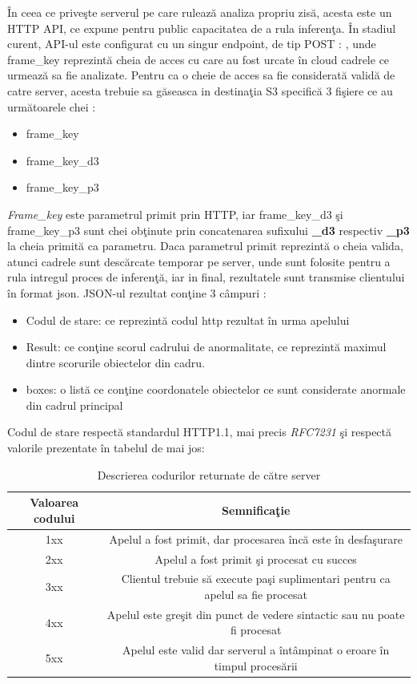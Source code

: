 \documentclass[a4paper,12pt]{report}
\begin{document}
\par
În ceea ce priveşte serverul pe care rulează analiza propriu zisă, acesta este un HTTP API, ce expune pentru public capacitatea de a rula inferenţa. În stadiul curent, API-ul este configurat cu un singur endpoint, de tip POST  :  , unde frame\_key reprezintă cheia de acces cu care au fost urcate în cloud cadrele ce urmează sa fie analizate. Pentru ca o cheie de acces sa fie considerată validă de catre server, acesta trebuie sa găseasca in destinaţia S3 specifică 3 fişiere ce au următoarele chei :
\begin{itemize}
\item frame\_key
\item frame\_key\_d3
\item frame\_key\_p3
\end{itemize}
\par \emph{Frame\_key} este parametrul primit prin HTTP,  iar frame\_key\_d3 şi frame\_key\_p3 sunt chei obţinute prin concatenarea sufixului \textbf{\_d3} respectiv \textbf{\_p3} la cheia primită ca parametru. Daca parametrul primit reprezintă o cheia valida, atunci cadrele sunt descărcate temporar pe server, unde sunt folosite pentru a rula intregul proces de inferenţă, iar in final, rezultatele sunt transmise clientului în format json. 
JSON-ul rezultat conţine 3 câmpuri : 
\begin{itemize}
\item Codul de stare: ce reprezintă codul http rezultat în urma apelului
\item Result: ce conţine scorul cadrului de anormalitate, ce reprezintă maximul dintre scorurile obiectelor din cadru.
\item boxes: o listă ce conţine coordonatele obiectelor ce sunt considerate anormale din cadrul principal
\end{itemize}
\par Codul de stare respectă standardul HTTP1.1, mai precis \emph{RFC7231}\cite{RFC7231} şi respectă valorile prezentate în tabelul de mai jos: 
\begin{table}[h]
\begin{tabular}{|c|c|}
\hline
Valoarea codului & Semnificaţie                                                                   \\
\hline
1xx   & Apelul a fost primit, dar procesarea încă este în desfaşurare                  \\
\hline
2xx   & Apelul a fost primit şi procesat cu succes                                     \\
\hline
3xx   & Clientul trebuie să execute paşi suplimentari pentru ca apelul sa fie procesat \\
\hline
4xx   & Apelul este greşit din punct de vedere sintactic sau nu poate fi procesat      \\
\hline
5xx   & Apelul este valid dar serverul a întâmpinat o eroare în timpul procesării   \\
\hline   
\end{tabular}
\caption{Descrierea codurilor returnate de către server}
\end{table}
\end{document}
